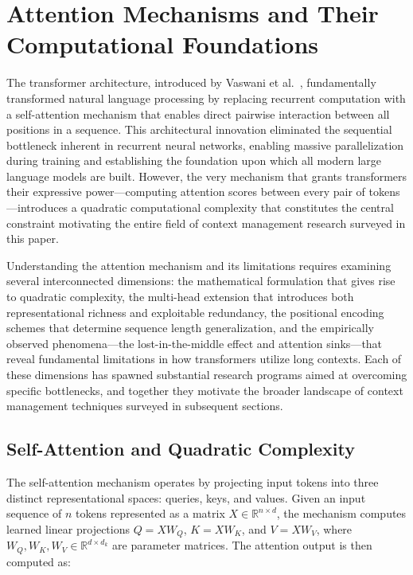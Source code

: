 \documentclass[11pt,letterpaper]{article}
\begin{document}
\newpage

\section{Attention Mechanisms and Their Computational Foundations}
\label{sec:attention}

The transformer architecture, introduced by Vaswani et al.\ \cite{vaswani2017attention}, fundamentally transformed natural language processing by replacing recurrent computation with a self-attention mechanism that enables direct pairwise interaction between all positions in a sequence. This architectural innovation eliminated the sequential bottleneck inherent in recurrent neural networks, enabling massive parallelization during training and establishing the foundation upon which all modern large language models are built. However, the very mechanism that grants transformers their expressive power---computing attention scores between every pair of tokens---introduces a quadratic computational complexity that constitutes the central constraint motivating the entire field of context management research surveyed in this paper.

Understanding the attention mechanism and its limitations requires examining several interconnected dimensions: the mathematical formulation that gives rise to quadratic complexity, the multi-head extension that introduces both representational richness and exploitable redundancy, the positional encoding schemes that determine sequence length generalization, and the empirically observed phenomena---the lost-in-the-middle effect and attention sinks---that reveal fundamental limitations in how transformers utilize long contexts. Each of these dimensions has spawned substantial research programs aimed at overcoming specific bottlenecks, and together they motivate the broader landscape of context management techniques surveyed in subsequent sections.

\subsection{Self-Attention and Quadratic Complexity}

The self-attention mechanism operates by projecting input tokens into three distinct representational spaces: queries, keys, and values. Given an input sequence of $n$ tokens represented as a matrix $X \in \mathbb{R}^{n \times d}$, the mechanism computes learned linear projections $Q = XW_Q$, $K = XW_K$, and $V = XW_V$, where $W_Q, W_K, W_V \in \mathbb{R}^{d \times d_k}$ are parameter matrices. The attention output is then computed as:
\end{document}
